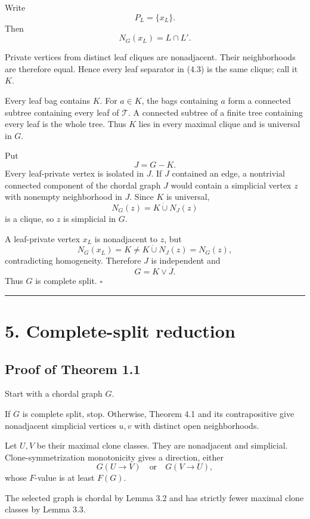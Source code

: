 \documentclass[11pt,a4paper]{article}
\begin{document}
Write
\[
P_L=\{x_L\}.
\]
Then
\[
N_G(x_L)=L\cap L'.
\tag{4.3}
\]

Private vertices from distinct leaf cliques are nonadjacent. Their
neighborhoods are therefore equal. Hence every leaf separator in (4.3) is
the same clique; call it \(K\).

Every leaf bag contains \(K\). For \(a\in K\), the bags containing \(a\)
form a connected subtree containing every leaf of \(\mathcal T\). A
connected subtree of a finite tree containing every leaf is the whole tree.
Thus \(K\) lies in every maximal clique and is universal in \(G\).

Put
\[
J=G-K.
\]
Every leaf-private vertex is isolated in \(J\). If \(J\) contained an edge,
a nontrivial connected component of the chordal graph \(J\) would contain a
simplicial vertex \(z\) with nonempty neighborhood in \(J\). Since \(K\) is
universal,
\[
N_G(z)=K\dot\cup N_J(z)
\]
is a clique, so \(z\) is simplicial in \(G\).

A leaf-private vertex \(x_L\) is nonadjacent to \(z\), but
\[
N_G(x_L)=K
\ne
K\dot\cup N_J(z)=N_G(z),
\]
contradicting homogeneity. Therefore \(J\) is independent and
\[
G=K\vee\overline J.
\]
Thus \(G\) is complete split.
\(\square\)

\begin{center}\rule{0.5\linewidth}{0.5pt}\end{center}

\section{5. Complete-split reduction}\label{complete-split-reduction}

\subsection{Proof of Theorem 1.1}\label{proof-of-theorem-1.1}

Start with a chordal graph \(G\).

If \(G\) is complete split, stop. Otherwise, Theorem 4.1 and its
contrapositive give nonadjacent simplicial vertices \(u,v\) with distinct
open neighborhoods.

Let \(U,V\) be their maximal clone classes. They are nonadjacent and
simplicial. Clone-symmetrization monotonicity gives a direction, either
\[
G(U\to V)
\quad\text{or}\quad
G(V\to U),
\]
whose \(F\)-value is at least \(F(G)\).

The selected graph is chordal by Lemma 3.2 and has strictly fewer maximal
clone classes by Lemma 3.3.
\end{document}
